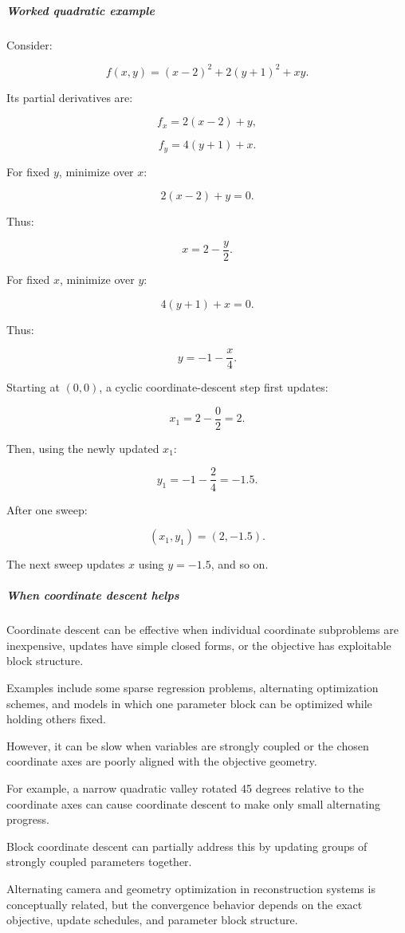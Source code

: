 \subparagraph{Worked quadratic example}\label{worked-quadratic-example}

Consider:

\[
f(x,y)= (x-2)^2+2(y+1)^2+xy.
\]

Its partial derivatives are:

\[
f_x=2(x-2)+y,
\]

\[
f_y=4(y+1)+x.
\]

For fixed \(y\), minimize over \(x\):

\[
2(x-2)+y=0.
\]

Thus:

\[
\boxed{x=2-\frac y2}.
\]

For fixed \(x\), minimize over \(y\):

\[
4(y+1)+x=0.
\]

Thus:

\[
\boxed{y=-1-\frac x4}.
\]

Starting at \((0,0)\), a cyclic coordinate-descent step first updates:

\[
x_1=2-\frac02=2.
\]

Then, using the newly updated \(x_1\):

\[
y_1=-1-\frac24=-1.5.
\]

After one sweep:

\[
\boxed{(x_1,y_1)=(2,-1.5)}.
\]

The next sweep updates \(x\) using \(y=-1.5\), and so on.

\subparagraph{When coordinate descent helps}\label{when-coordinate-descent-helps}

Coordinate descent can be effective when individual coordinate subproblems are inexpensive, updates have simple closed forms, or the objective has exploitable block structure.

Examples include some sparse regression problems, alternating optimization schemes, and models in which one parameter block can be optimized while holding others fixed.

However, it can be slow when variables are strongly coupled or the chosen coordinate axes are poorly aligned with the objective geometry.

For example, a narrow quadratic valley rotated 45 degrees relative to the coordinate axes can cause coordinate descent to make only small alternating progress.

Block coordinate descent can partially address this by updating groups of strongly coupled parameters together.

Alternating camera and geometry optimization in reconstruction systems is conceptually related, but the convergence behavior depends on the exact objective, update schedules, and parameter block structure.

